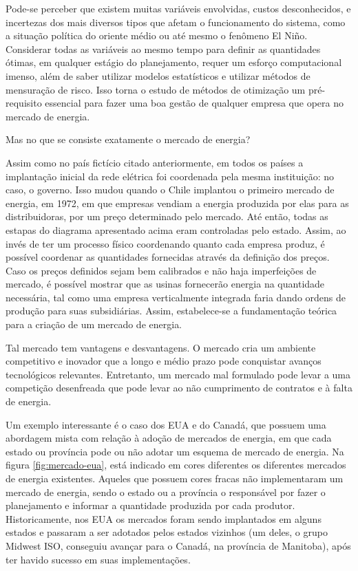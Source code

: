 Pode-se perceber que existem muitas variáveis envolvidas, custos desconhecidos,
e incertezas dos mais diversos tipos que afetam o funcionamento do
sistema, como a situação política do oriente médio ou até mesmo o
fenômeno El Niño. Considerar todas as variáveis ao mesmo tempo para
definir as quantidades ótimas, em qualquer estágio do planejamento,
requer um esforço computacional imenso, além de saber utilizar modelos estatísticos e utilizar métodos de mensuração de risco. Isso torna o estudo de métodos
de otimização um pré-requisito essencial para fazer uma boa gestão
de qualquer empresa que opera no mercado de energia.

Mas no que se consiste exatamente o mercado de energia?


Assim como no país fictício citado anteriormente, em todos os países a implantação inicial
da rede elétrica foi coordenada pela mesma instituição:
no caso, o governo. Isso mudou quando o Chile implantou o primeiro mercado de energia, em 1972, em que empresas vendiam a energia produzida por elas para as distribuidoras, por um preço determinado pelo mercado. Até então, todas as estapas do diagrama apresentado acima eram controladas pelo estado.
Assim, ao invés de ter um processo físico coordenando quanto cada empresa produz, é possível coordenar as quantidades fornecidas através da definição dos preços.
Caso os preços definidos sejam bem calibrados e não haja imperfeições
de mercado, é possível mostrar que as usinas fornecerão energia na
quantidade necessária, tal como uma empresa verticalmente integrada
faria dando ordens de produção para suas subsidiárias. Assim, estabelece-se
a fundamentação teórica para a criação de um mercado de energia.

Tal mercado tem vantagens e desvantagens. O mercado cria um ambiente competitivo e inovador que a longo e médio prazo pode conquistar avanços tecnológicos relevantes. Entretanto, um mercado mal formulado pode levar a uma competição desenfreada que pode levar ao não cumprimento de contratos e à falta de energia. 

Um exemplo interessante é o caso dos EUA e do Canadá, que possuem uma abordagem mista com relação à adoção de mercados de energia, em que cada estado ou província pode ou não adotar um esquema de mercado de energia. Na figura \ref{fig:mercado-eua}, está indicado em cores diferentes os diferentes mercados de energia existentes. Aqueles que possuem cores fracas não implementaram um mercado de energia, sendo o estado ou a província o responsável por fazer o planejamento e informar a quantidade produzida por cada produtor. Historicamente, nos EUA os mercados foram sendo implantados em alguns estados e passaram a ser adotados pelos estados vizinhos (um deles, o grupo Midwest ISO, conseguiu avançar para o Canadá, na província de Manitoba), após ter havido sucesso em suas implementações.  

